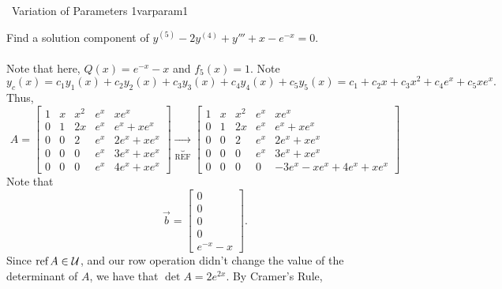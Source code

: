         \begin{example}{\Difficulty\,\Difficulty\,\,Variation of Parameters 1}{varparam1}

            Find a solution component of \(y^{(5)}-2y^{(4)}+y'''+x-e^{-x}=0\).
            \\
            \\
            Note that here, \(Q(x)=e^{-x}-x\) and \(f_5(x)=1\). Note
            \begin{equation*}
                y_c(x)=c_1y_1(x)+c_2y_2(x)+c_3y_3(x)+c_4y_4(x)+c_5y_5(x)=c_1+c_2x+c_3x^2+c_4e^x+c_5xe^x.
            \end{equation*}
            Thus,
            \begin{equation*}
                A=\begin{bmatrix}
                    1 & x & x^2 & e^x & xe^x \\
                    0 & 1 & 2x & e^x & e^x+xe^x \\
                    0 & 0 & 2 & e^x & 2e^x+xe^x \\
                    0 & 0 & 0 & e^x & 3e^x+xe^x \\
                    0 & 0 & 0 &  e^x & 4e^x+xe^x
                \end{bmatrix}\underbrace{\to}_{\text{REF}}\begin{bmatrix}
                    1 & x & x^2 & e^x & xe^x \\
                    0 & 1 & 2x & e^x & e^x+xe^x \\
                    0 & 0 & 2 & e^x & 2e^x+xe^x \\
                    0 & 0 & 0 & e^x & 3e^x+xe^x \\
                    0 & 0 & 0 & 0 & -3e^x-xe^x+4e^x+xe^x
                \end{bmatrix}
            \end{equation*}
            Note that
            \begin{equation*}
                \vec{b}=\begin{bmatrix}
                    0 \\ 0 \\ 0 \\ 0 \\ e^{-x}-x
                \end{bmatrix}.
            \end{equation*}
            Since \(\text{ref\,} A \in\mathcal{U}\), and our row operation didn't change the value of the determinant of \(A\), we have that \(\det A=2e^{2x}\). By Cramer's Rule,

\end{example}
